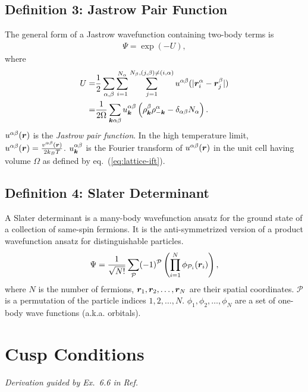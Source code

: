 \subsection{Definition 3: Jastrow Pair Function}
The general form of a Jastrow wavefunction containing two-body terms is
\begin{align} \label{eq:wf-def-jas}
\Psi = \exp\left(-U\right),
\end{align}
where
\begin{align} \label{eq:wf-def-j2}
U =& \frac{1}{2}\sum\limits_{\alpha, \beta} \sum\limits_{i=1}^{N_\alpha} \sum\limits_{j=1}^{N_\beta, (j,\beta)\neq(i,\alpha)} 
u^{\alpha\beta}(\vert\boldsymbol{r}_i^\alpha - \boldsymbol{r}_j^\beta \vert) \nonumber \\
=& \frac{1}{2\Omega} \sum\limits_{\boldsymbol{k}\alpha\beta}
u^{\alpha\beta}_{\boldsymbol{k}} \left( \rho^\beta_{\boldsymbol{k}}\rho^\alpha_{-\boldsymbol{k}}-\delta_{\alpha\beta}N_\alpha \right).
\end{align}
$u^{\alpha\beta}(\boldsymbol{r})$ is the \emph{Jastrow pair function}. In the high temperature limit, $u^{\alpha\beta}(\boldsymbol{r})=\frac{v^{\alpha\beta}(\boldsymbol{r})}{2k_BT}$. $u^{\alpha\beta}_{\boldsymbol{k}}$ is the Fourier transform of $u^{\alpha\beta}(\boldsymbol{r})$ in the unit cell having volume $\Omega$ as defined by eq.~(\ref{eq:lattice-ift}).

\subsection{Definition 4: Slater Determinant}
A Slater determinant is a many-body wavefunction ansatz for the ground state of a collection of same-spin fermions. It is the anti-symmetrized version of a product wavefunction ansatz for distinguishable particles.
\begin{align}
\Psi = \frac{1}{\sqrt{N!}}\sum\limits_{\mathcal{P}} (-1)^{\mathcal{P}} \left( \prod\limits_{i=1}^N \phi_{\mathcal{P}_i}(\boldsymbol{r}_i) \right),\label{eq:det}
\end{align}
where $N$ is the number of fermions, $\boldsymbol{r}_1, \boldsymbol{r}_2, \dots, \boldsymbol{r}_N$ are their spatial coordinates. $\mathcal{P}$ is a permutation of the particle indices $1, 2, \dots, N$. $\phi_1, \phi_2, \dots, \phi_N$ are a set of one-body wave functions (a.k.a. orbitals).

\section{Cusp Conditions}\label{sec:wf-cusp}
\emph{Derivation guided by Ex.~6.6 in Ref.~\cite{Martin2016}}

